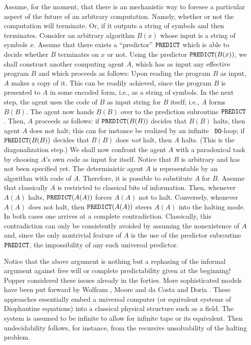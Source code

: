 Assume, for the moment,
that there is an mechanistic way to foresee a particular aspect of
the future
of an arbitrary computation. Namely, whether or not the computation
will terminate.
Or, if it outputs a string of symbols and then terminates.
Consider an arbitrary algorithm $B(x)$ whose input is a string of
symbols
$x$.
 Assume that there exists a ``predictor'' ${\tt
PREDICT}$
 which  is
 able to decide whether $B$ terminates on $x$ or not.
 Using  the predictor ${\tt PREDICT}(B(x))$, we shall construct another
  computing agent
$A$, which
 has as input any effective program $B$ and which proceeds as follows:
 Upon reading the program $B$ as input, $A$ makes a copy of it.
 This  can be readily achieved, since
 the program $B$ is presented to $A$  in some
 encoded form, i.e., as a string of symbols. In the next
 step, the agent uses the
 code of $B$ as input string for $B$ itself; i.e., $A$  forms
 $B(B)$. The agent now hands
 $B(B)$ over to the prediction subroutine
${\tt PREDICT}$.
 Then, $A$ proceeds as follows:
  if ${\tt PREDICT}(B(B))$ decides that $B(B)$
 halts, then agent
 $A$ does not halt;
this can for instance be realized by an infinite {\tt
 DO}-loop;
  if ${\tt PREDICT}(B(B))$ decides that $B(B)$
 does {\em not} halt, then
 $A$ halts. (This is the diagonalization step.)
 We shall now confront the agent $A$ with a paradoxical task by
 choosing $A$'s own code as input for itself.
Notice that $B$ is arbitrary and has not been specified yet.
The deterministic agent $A$ is representable by an algorithm with code
of $A$. Therefore, it is possible to substitute $A$ for $B$.
Assume that classically $A$ is restricted to classical bits of
information.
Then, whenever
 $A(A)$ halts,  ${\tt PREDICT}(A(A))$  forces
 $A(A)$ not to halt.
Conversely, whenever $A(A)$ does not halt, then ${\tt PREDICT}(A(A))$
 steers $A(A)$
 into the halting mode. In both cases one arrives at a
complete contradiction.
 Classically,
this contradiction can only be consistently avoided by
 assuming
 the nonexistence of $A$ and, since the only nontrivial feature of $A$
 is the use of the predictor subroutine
 ${\tt PREDICT}$, the impossibility of any such
 universal predictor.


Notice that the above argument is nothing but a rephasing of the
informal
argument against free will or complete predictability given at the
beginning!
Popper \cite{popper-48} considered these issues already in the forties.
More sophisticated  models have been put forward
by  Wolfram \cite{wolfram}, Moore
\cite{moore} and da Costa and  Doria  \cite{dacosta}.
These approaches essentially embed a universal computer
(or equivalent systems of Diophantine equations)
into a classical physical structure such as a field.
 The system is assumed
to be infinite to allow for infinite tape or its equivalent.
Then undecidability follows, for instance, from the
recursive unsolvability of the halting problem.

